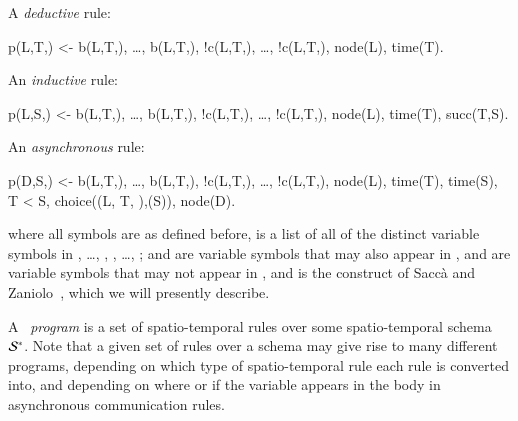 
A {\em deductive} rule:

\begin{Dedalus}
p(L,T,) <- b(L,T,), \ldots, b(L,T,),
!c(L,T,), \ldots, !c(L,T,), node(L), time(T).
\end{Dedalus}

An {\em inductive} rule:

\begin{Dedalus}
p(L,S,) <- b(L,T,), \ldots, b(L,T,),
!c(L,T,), \ldots, !c(L,T,), node(L), time(T), succ(T,S).
\end{Dedalus}

%

An {\em asynchronous} rule:

\begin{Dedalus}
p(D,S,) <- b(L,T,), \ldots, b(L,T,),
!c(L,T,), \ldots, !c(L,T,), node(L), time(T), time(S),
T < S, choice((L, T, ),(S)), node(D).
\end{Dedalus}


where all symbols are as defined before,  is a list of all of the distinct variable symbols in , \ldots, , , \ldots, ;  and  are variable symbols that may also appear in ,  and  are variable symbols that may not appear in , and  is the construct of Sacc\`{a} and Zaniolo~\cite{sacca-zaniolo}, which we will presently describe.

A \lang\ {\em program} is a set of spatio-temporal rules over some spatio-temporal schema $\mathcal{S}^*$.  Note that a given set of rules over a schema may give rise to many different \lang programs, depending on which type of spatio-temporal rule each rule is converted into, and depending on where or if the variable  appears in the body in asynchronous communication rules. 

